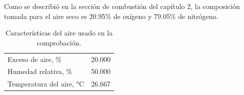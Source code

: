 \par Como se describió en la sección de combustión del capítulo 2, la composición tomada para el aire seco es 20.95\% de oxígeno y 79.05\% de nitrógeno.
\begin{table}[hbt]\begin{center}
\caption[Características del aire]{Características del aire usado en la comprobación.}
\label{tbl:aire}\begin{tabular}{l|r}
	Exceso de aire, \%								& 20.000 \\
	Humedad relativa, \%							& 50.000 \\
	Temperatura del aire, °C						& 26.667 \\
\end{tabular}\end{center}\end{table}